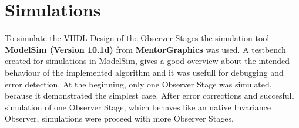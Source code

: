 %



\section{Simulations}
To simulate the VHDL Design of the Observer Stages  the simulation tool \textbf{ModelSim (Version 10.1d)} from \textbf{MentorGraphics} was used.  
A testbench created for simulations in ModelSim, gives a good overview about the intended behaviour of the implemented algorithm and it was usefull for debugging and error detection.
At the beginning, only one Observer Stage was simulated, because it demonstrated the simplest case. After error corrections and succesfull simulation of one Observer Stage, which behaves 
like an native Invariance Observer, simulations were proceed with more Observer Stages.\\
 
